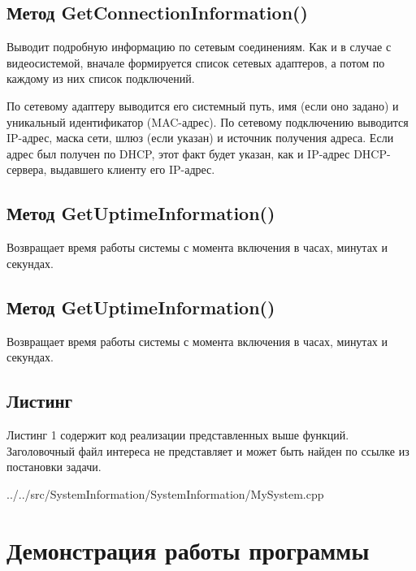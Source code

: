 \documentclass[a4paper, 12pt]{report}		%
\begin{document}
\section*{Метод GetConnectionInformation()}
Выводит подробную информацию по сетевым соединениям. Как и в случае с видеосистемой, вначале формируется список сетевых адаптеров, а потом по каждому из них список подключений.
\vspace{1em}

По сетевому адаптеру выводится его системный путь, имя (если оно задано) и уникальный идентификатор (MAC-адрес). По сетевому подключению выводится IP-адрес, маска сети, шлюз (если указан) и источник получения адреса. Если адрес был получен по DHCP, этот факт будет указан, как и IP-адрес DHCP-сервера, выдавшего клиенту его IP-адрес.

\section*{Метод GetUptimeInformation()}
Возвращает время работы системы с момента включения в часах, минутах и секундах.

\section*{Метод GetUptimeInformation()}
Возвращает время работы системы с момента включения в часах, минутах и секундах.

\section*{Листинг}
Листинг 1 содержит код реализации представленных выше функций. Заголовочный файл интереса не представляет и может быть найден по ссылке из постановки задачи.


{../../src/SystemInformation/SystemInformation/MySystem.cpp}

\chapter*{Демонстрация работы программы}
\end{document}
